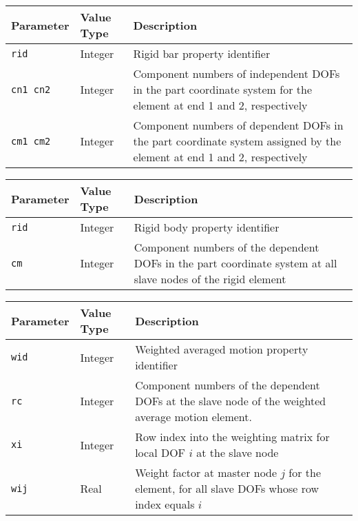 \clearpage

\noindent
\begin{tabular}{| m{} | m{} | m{} |}
  \hline
  \rowcolor[HTML]{EFEFEF}
  Parameter & Value Type & Description \\
  \hline\hline
  {\tt rid} & Integer & Rigid bar property identifier \\
  \hline
  {\tt cn1 cn2} & Integer & Component numbers of independent DOFs in
                            the part coordinate system for the element
                            at end 1 and 2, respectively \\
  \hline
  {\tt cm1 cm2} & Integer & Component numbers of dependent DOFs in
                            the part coordinate system assigned by the element
                            at end 1 and 2, respectively \\
  \hline
\end{tabular}


\noindent
\begin{tabular}{| m{} | m{} | m{} |}
  \hline
  \rowcolor[HTML]{EFEFEF}
  Parameter & Value Type & Description \\
  \hline\hline
  {\tt rid} & Integer & Rigid body property identifier \\
  \hline
  {\tt cm}  & Integer & Component numbers of the dependent DOFs in
                        the part coordinate system at all slave nodes of
                        the rigid element \\
  \hline
\end{tabular}


\noindent
\begin{tabular}{| m{} | m{} | m{} |}
  \hline
  \rowcolor[HTML]{EFEFEF}
  Parameter & Value Type & Description \\
  \hline\hline
  {\tt wid} & Integer & Weighted averaged motion property identifier \\
  \hline
  {\tt rc}  & Integer & Component numbers of the dependent DOFs at the slave
                        node of the weighted average motion element. \\
  \hline
  {\tt xi}  & Integer & Row index into the weighting matrix for local
                        DOF $i$ at the slave node \\
  \hline
  {\tt wij} & Real & Weight factor at master node $j$ for the element,
                     for all slave DOFs whose row index equals $i$ \\
  \hline
\end{tabular}


